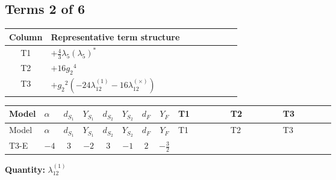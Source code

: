 \documentclass[8pt]{article}
\begin{document}
\begin{landscape}
\subsection*{Terms 2 of 6}
\begin{center}
\begin{tabular}{@{}c >{\raggedright\arraybackslash}p{0.82\linewidth}@{}}
\toprule
Column & Representative term structure \\
\midrule
T1 & \(\displaystyle +\frac{4}{3} {\lambda_5} \left({\lambda_5}\right)^{*}\) \\
\midrule
T2 & \(\displaystyle +16 {g_2}^4\) \\
\midrule
T3 & \(\displaystyle +{g_2}^2 (-24 {\lambda_{12}^{(1)}}-16 {\lambda_{12}^{(\times)}})\) \\
\midrule
\bottomrule
\end{tabular}
\end{center}
\smallskip
\tiny
\begin{longtable}{@{}llcccccc >{\raggedright\arraybackslash}p{0.21\linewidth} >{\raggedright\arraybackslash}p{0.21\linewidth} >{\raggedright\arraybackslash}p{0.21\linewidth}@{}}
\toprule
Model & $\alpha$ & $d_{S_1}$ & $Y_{S_1}$ & $d_{S_2}$ & $Y_{S_2}$ & $d_F$ & $Y_F$ & T1 & T2 & T3 \\
\midrule
\endfirsthead
\toprule
Model & $\alpha$ & $d_{S_1}$ & $Y_{S_1}$ & $d_{S_2}$ & $Y_{S_2}$ & $d_F$ & $Y_F$ & T1 & T2 & T3 \\
\midrule
\endhead
T3-E & $-4$ & $3$ & $-2$ & $3$ & $-1$ & $2$ & $-\frac{3}{2}$ & \scriptsize\adjustbox{max width=\linewidth}{$\begin{gathered} +\frac{4}{3} {\lambda_5} \left({\lambda_5}\right)^{*}\end{gathered}$} & \scriptsize\adjustbox{max width=\linewidth}{$\begin{gathered} +16 {g_2}^4\end{gathered}$} & \scriptsize\adjustbox{max width=\linewidth}{$\begin{gathered} +{g_2}^2 (-24 {\lambda_{12}^{(1)}}-16 {\lambda_{12}^{(\times)}})\end{gathered}$} \\
\midrule
\bottomrule
\end{longtable}
\clearpage
\noindent\textbf{Quantity: }$\lambda_{12}^{(1)}$\par\smallskip

\end{landscape}
\end{document}
